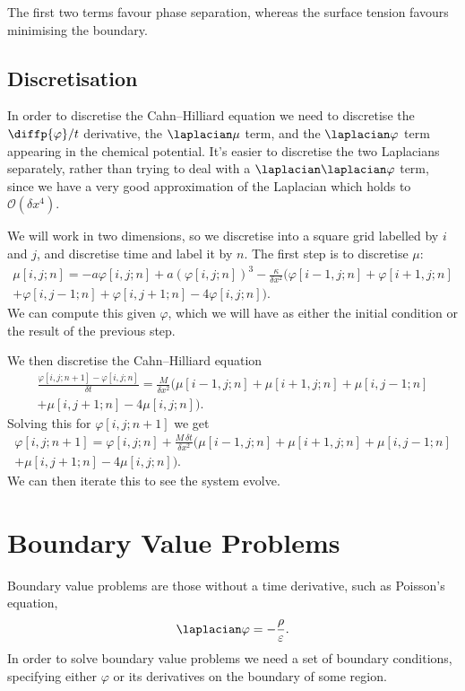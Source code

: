 \documentclass[fleqn]{NotesClass}
\newcommand*{\order}{\mathcal{O}}
\begin{document}
    The first two terms favour phase separation, whereas the surface tension favours minimising the boundary.
    
    \section{Discretisation}
    In order to discretise the Cahn--Hilliard equation we need to discretise the \(\diffp{\varphi}/{t}\) derivative, the \(\laplacian\mu\) term, and the \(\laplacian\varphi\) term appearing in the chemical potential.
    It's easier to discretise the two Laplacians separately, rather than trying to deal with a \(\laplacian\laplacian\varphi\) term, since we have a very good approximation of the Laplacian which holds to \(\order(\delta x^4)\).
    
    We will work in two dimensions, so we discretise into a square grid labelled by \(i\) and \(j\), and discretise time and label it by \(n\).
    The first step is to discretise \(\mu\):
    \begin{multline}
        \mu[i, j; n] = -a\varphi[i, j; n] + a(\varphi[i, j; n])^3 - \frac{\kappa}{\delta x^2}(\varphi[i - 1, j; n] + \varphi[i + 1, j; n]\\
        + \varphi[i, j - 1; n] + \varphi[i, j + 1; n] - 4\varphi[i, j; n]).
    \end{multline}
    We can compute this given \(\varphi\), which we will have as either the initial condition or the result of the previous step.
    
    We then discretise the Cahn--Hilliard equation
    \begin{multline}
        \frac{\varphi[i, j; n + 1] - \varphi[i, j; n]}{\delta t} = \frac{M}{\delta x^2}(\mu[i - 1, j; n] + \mu[i + 1, j; n] + \mu[i, j - 1; n]\\
        + \mu[i, j + 1; n] - 4\mu[i, j; n]).
    \end{multline}
    Solving this for \(\varphi[i, j; n + 1]\) we get
    \begin{multline}
        \varphi[i, j; n + 1] = \varphi[i, j; n] + \frac{M \, \delta t}{\delta x^2}(\mu[i - 1, j; n] + \mu[i + 1, j; n] + \mu[i, j - 1; n]\\
        + \mu[i, j + 1; n] - 4\mu[i, j; n]).
    \end{multline}
    We can then iterate this to see the system evolve.
    
    \chapter{Boundary Value Problems}
    Boundary value problems are those without a time derivative, such as Poisson's equation,
    \begin{equation}
        \laplacian \varphi = -\frac{\rho}{\varepsilon}.
    \end{equation}
    In order to solve boundary value problems we need a set of boundary conditions, specifying either \(\varphi\) or its derivatives on the boundary of some region.
    
\end{document}
